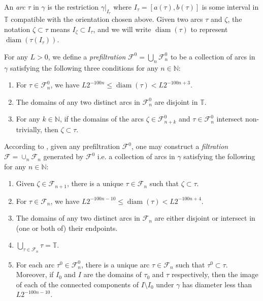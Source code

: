 \documentclass[11pt]{amsart}
\def\diam{{\rm diam\,}}
\theoremstyle{definition}
\def\diam{\operatorname{diam}}
\numberwithin{theorem}{section} \numberwithin{equation}{section}
\begin{document}
An \emph{arc} $\tau$ in $\gamma$ is 
the restriction $\gamma|_{I_{\tau}}$
where $I_{\tau} = [a(\tau),b(\tau)]$ is some interval in $\mathbb{T}$ compatible with the orientation chosen above.
Given two arcs $\tau$ and $\zeta$, the notation $\zeta \subset \tau$ means $I_{\zeta} \subset I_{\tau}$,
and we will write $\diam(\tau)$ to represent $\diam(\tau(I_{\tau}))$.



For any $L>0$, we define a \emph{prefiltration} $\mathcal{F}^0 = \bigcup_{n} \mathcal{F}_n^0$ to be 
a collection of arcs in $\gamma$ satisfying the following three conditions for any $n \in \mathbb{N}$:
\begin{enumerate}
\item For $\tau \in \mathcal{F}_n^0$, we have $L2^{-100n} \leq \diam(\tau) <L2^{-100n+3}$.
\item The domains of any two distinct arcs in $\mathcal{F}_n^0$ are disjoint in $\mathbb{T}$.
\item For any $k \in \mathbb{N}$, if the domains of the arcs $\zeta \in \mathcal{F}_{n+k}^0$ and $\tau \in \mathcal{F}_n^0$ intersect non-trivially, then $\zeta \subset \tau$.
\end{enumerate}
According to \cite[Lemma 2.13]{LiSchul},
given any prefiltration $\mathcal{F}^0$,
one may construct a \emph{filtration} $\mathcal{F} = \cup_{n} \mathcal{F}_n$
generated by $\mathcal{F}^0$
i.e. a collection of arcs in $\gamma$ satisfying the following for any $n \in \mathbb{N}$:
\begin{enumerate}
\item Given $\zeta \in \mathcal{F}_{n+1}$, there is a unique $\tau \in \mathcal{F}_n$ such that $\zeta \subset \tau$.
\item For $\tau \in \mathcal{F}_n$, we have $L 2^{-100n-10} \leq \diam(\tau)<L2^{-100n+4}$.
\item The domains of any two distinct arcs in $\mathcal{F}_n$ are either disjoint or intersect in (one or both of) their endpoints.
\item $\bigcup_{\tau \in \mathcal{F}_n} \tau = \mathbb{T}$.
\item For each arc $\tau^0 \in \mathcal{F}_n^0$, there is a unique arc $\tau \in \mathcal{F}_n$ such that $\tau^0 \subset \tau$. Moreover, if $I_0$ and $I$ are the domains of $\tau_0$ and $\tau$ respectively, then the image of each of the connected components of $I \setminus I_0$ under $\gamma$ has diameter less than $L 2^{-100n-10}$.
\end{enumerate}
\end{document}
